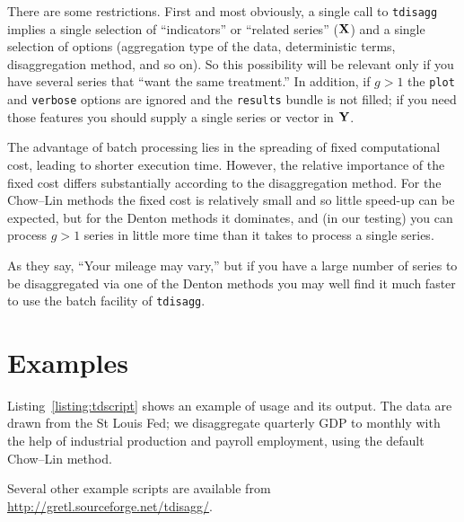 There are some restrictions. First and most obviously, a single call
to \texttt{tdisagg} implies a single selection of ``indicators'' or
``related series'' ($\mathbf{X}$) and a single selection of options
(aggregation type of the data, deterministic terms, disaggregation
method, and so on). So this possibility will be relevant only if you
have several series that ``want the same treatment.'' In addition, if
$g > 1$ the \texttt{plot} and \texttt{verbose} options are ignored and
the \texttt{results} bundle is not filled; if you need those features
you should supply a single series or vector in $\mathbf{Y}$.

The advantage of batch processing lies in the spreading of fixed
computational cost, leading to shorter execution time. However, the
relative importance of the fixed cost differs substantially according
to the disaggregation method. For the Chow--Lin methods the fixed cost
is relatively small and so little speed-up can be expected, but for
the Denton methods it dominates, and (in our testing) you can process
$g > 1$ series in little more time than it takes to process a single
series.

As they say, ``Your mileage may vary,'' but if you have a large number
of series to be disaggregated via one of the Denton methods you may
well find it much faster to use the batch facility of
\texttt{tdisagg}.

\section{Examples}
\label{sec:tdisagg-examples}

Listing~\ref{listing:tdscript} shows an example of usage and its
output. The data are drawn from the St Louis Fed; we disaggregate
quarterly GDP to monthly with the help of industrial production and
payroll employment, using the default Chow--Lin method.

Several other example scripts are available from
\url{http://gretl.sourceforge.net/tdisagg/}.

